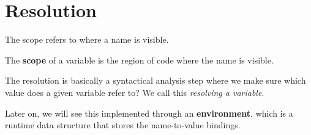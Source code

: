 \section{Resolution} 

  The scope refers to where a name is visible. 

  \begin{definition}[Scope]
    \label{def:scope}
    The \textbf{scope} of a variable is the region of code where the name is visible. 
  \end{definition}

  The resolution is basically a syntactical analysis step where we make sure which value does a given variable refer to? We call this \textit{resolving a variable}. 

  Later on, we will see this implemented through an \textbf{environment}, which is a runtime data structure that stores the name-to-value bindings. 
